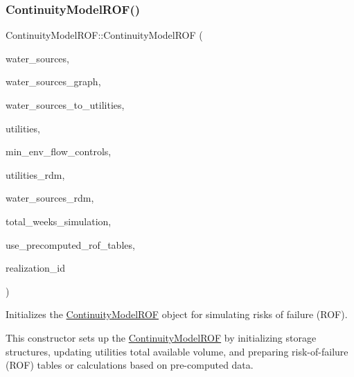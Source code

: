 \subsubsection{\texorpdfstring{Continuity\+Model\+R\+O\+F()}{ContinuityModelROF()}}
{\footnotesize\ttfamily Continuity\+Model\+R\+O\+F\+::\+Continuity\+Model\+R\+OF (\begin{DoxyParamCaption}\item[{vector$<$ \mbox{\hyperlink{classWaterSource}{Water\+Source}} $\ast$$>$}]{water\+\_\+sources,  }\item[{const \mbox{\hyperlink{classGraph}{Graph}} \&}]{water\+\_\+sources\+\_\+graph,  }\item[{const vector$<$ vector$<$ int $>$$>$ \&}]{water\+\_\+sources\+\_\+to\+\_\+utilities,  }\item[{vector$<$ \mbox{\hyperlink{classUtility}{Utility}} $\ast$$>$}]{utilities,  }\item[{vector$<$ \mbox{\hyperlink{classMinEnvFlowControl}{Min\+Env\+Flow\+Control}} $\ast$$>$}]{min\+\_\+env\+\_\+flow\+\_\+controls,  }\item[{vector$<$ double $>$ \&}]{utilities\+\_\+rdm,  }\item[{vector$<$ double $>$ \&}]{water\+\_\+sources\+\_\+rdm,  }\item[{unsigned long}]{total\+\_\+weeks\+\_\+simulation,  }\item[{const int}]{use\+\_\+precomputed\+\_\+rof\+\_\+tables,  }\item[{const unsigned long}]{realization\+\_\+id }\end{DoxyParamCaption})}



Initializes the \mbox{\hyperlink{classContinuityModelROF}{Continuity\+Model\+R\+OF}} object for simulating risks of failure (R\+OF). 

This constructor sets up the \mbox{\hyperlink{classContinuityModelROF}{Continuity\+Model\+R\+OF}} by initializing storage structures, updating utilities\textquotesingle{} total available volume, and preparing risk-\/of-\/failure (R\+OF) tables or calculations based on pre-\/computed data.


